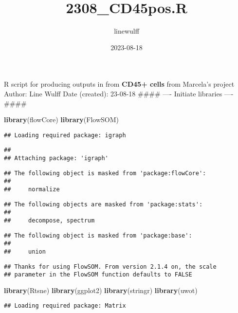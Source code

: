 \documentclass[
]{article}
\title{2308\_CD45pos.R}
\author{linewulff}
\date{2023-08-18}
\newenvironment{Shaded}{\begin{snugshade}}{\end{snugshade}}
\newcommand{\FunctionTok}[1]{\textcolor[rgb]{0.13,0.29,0.53}{\textbf{#1}}}
\newcommand{\NormalTok}[1]{#1}
\begin{document}
\maketitle

R script for producing outputs in from \textbf{CD45+ cells} from
Marcela's project Author: Line Wulff Date (created): 23-08-18 \#\#\#\#
---- Initiate libraries ---- \#\#\#\#

\begin{Shaded}
\begin{Highlighting}[]
\FunctionTok{library}\NormalTok{(flowCore)}
\FunctionTok{library}\NormalTok{(FlowSOM)}
\end{Highlighting}
\end{Shaded}

\begin{verbatim}
## Loading required package: igraph
\end{verbatim}

\begin{verbatim}
## 
## Attaching package: 'igraph'
\end{verbatim}

\begin{verbatim}
## The following object is masked from 'package:flowCore':
## 
##     normalize
\end{verbatim}

\begin{verbatim}
## The following objects are masked from 'package:stats':
## 
##     decompose, spectrum
\end{verbatim}

\begin{verbatim}
## The following object is masked from 'package:base':
## 
##     union
\end{verbatim}

\begin{verbatim}
## Thanks for using FlowSOM. From version 2.1.4 on, the scale 
## parameter in the FlowSOM function defaults to FALSE
\end{verbatim}

\begin{Shaded}
\begin{Highlighting}[]
\FunctionTok{library}\NormalTok{(Rtsne)}
\FunctionTok{library}\NormalTok{(ggplot2)}
\FunctionTok{library}\NormalTok{(stringr)}
\FunctionTok{library}\NormalTok{(uwot)}
\end{Highlighting}
\end{Shaded}

\begin{verbatim}
## Loading required package: Matrix
\end{verbatim}
\end{document}
